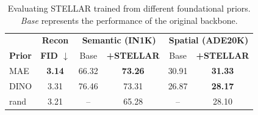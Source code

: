\begin{table}[ht]
\caption{Evaluating STELLAR trained from different foundational priors. \textit{Base} represents the performance of the original backbone.}
\label{init-table}
\begin{center}
\begin{small}
\begin{sc}
\setlength{\tabcolsep}{4pt}
\begin{tabular}{l | c | cc | cc}
\toprule
&  \bf Recon & \multicolumn{2}{c|}{\bf Semantic (IN1K)} & \multicolumn{2}{c}{\bf Spatial (ADE20K)} \\
\bf Prior &  \bf FID $\downarrow$ & Base & \bf +STELLAR & Base & \bf +STELLAR \\
\midrule
MAE &  \bf 3.14 & 66.32 & \bf 73.26 \color{blue}{(+6.9)} & 30.91 & \bf 31.33 \color{blue}{(+0.4)} \\
DINO &  3.31 & 76.46 & 73.31 \color{red}{(-3.2)} & 26.87 & \bf 28.17 \color{blue}{(+1.3)} \\
\midrule
rand & 3.21 & -- & 65.28 & -- & 28.10 \\
\bottomrule
\end{tabular}
\end{sc}
\end{small}
\end{center}
\end{table}